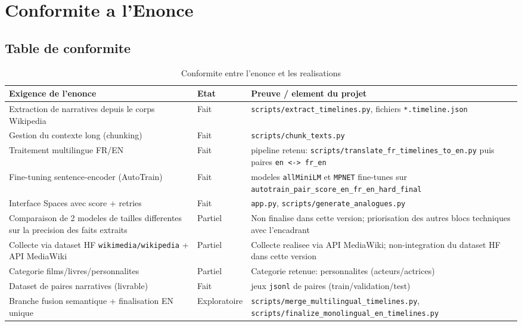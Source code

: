 ﻿\chapter{Conformite a l'Enonce}

\section{Table de conformite}
\begin{table}[H]
  \centering
  \caption{Conformite entre l'enonce et les realisations}
  \begin{tabular}{p{4.0cm}p{2.2cm}p{7.2cm}}
    \toprule
    Exigence de l'enonce & Etat & Preuve / element du projet \\
    \midrule
    Extraction de narratives depuis le corps Wikipedia & Fait & \texttt{scripts/extract\_timelines.py}, fichiers \texttt{*.timeline.json} \\
    Gestion du contexte long (chunking) & Fait & \texttt{scripts/chunk\_texts.py} \\
    Traitement multilingue FR/EN & Fait & pipeline retenu: \texttt{scripts/translate\_fr\_timelines\_to\_en.py} puis paires \texttt{en <-> fr\_en} \\
    Fine-tuning sentence-encoder (AutoTrain) & Fait & modeles \texttt{allMiniLM} et \texttt{MPNET} fine-tunes sur \texttt{autotrain\_pair\_score\_en\_fr\_en\_hard\_final} \\
    Interface Spaces avec score + retries & Fait & \texttt{app.py}, \texttt{scripts/generate\_analogues.py} \\
    Comparaison de 2 modeles de tailles differentes sur la precision des faits extraits & Partiel & Non finalise dans cette version; priorisation des autres blocs techniques avec l'encadrant \\
    Collecte via dataset HF \texttt{wikimedia/wikipedia} + API MediaWiki & Partiel & Collecte realisee via API MediaWiki; non-integration du dataset HF dans cette version \\
    Categorie films/livres/personnalites & Partiel & Categorie retenue: personnalites (acteurs/actrices) \\
    Dataset de paires narratives (livrable) & Fait & jeux \texttt{jsonl} de paires (train/validation/test) \\
    Branche fusion semantique + finalisation EN unique & Exploratoire & \texttt{scripts/merge\_multilingual\_timelines.py}, \texttt{scripts/finalize\_monolingual\_en\_timelines.py} \\
    \bottomrule
  \end{tabular}
\end{table}

